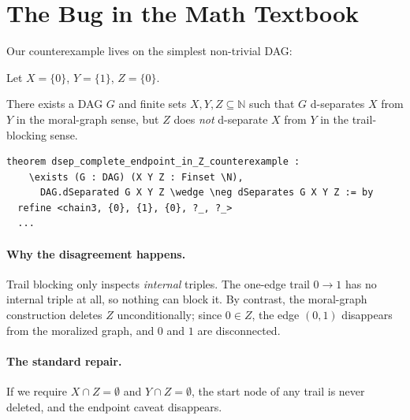 \documentclass[acmsmall,screen,nonacm]{acmart}
\newcommand{\N}{\mathbb{N}}
\begin{document}
\section{The Bug in the Math Textbook}\label{sec:counterexample}

Our counterexample lives on the simplest non-trivial DAG:

\begin{center}
\end{center}

Let $X = \{0\}$, $Y = \{1\}$, $Z = \{0\}$.

\begin{theorem}\label{thm:counterexample}
There exists a DAG $G$ and finite sets $X, Y, Z \subseteq \N$ such that
$G$ d-separates $X$ from $Y$ in the moral-graph sense, but $Z$ does \emph{not}
d-separate $X$ from $Y$ in the trail-blocking sense.
\end{theorem}

\begin{lstlisting}[caption={Mechanized counterexample}]
theorem dsep_complete_endpoint_in_Z_counterexample :
    \exists (G : DAG) (X Y Z : Finset \N),
      DAG.dSeparated G X Y Z \wedge \neg dSeparates G X Y Z := by
  refine <chain3, {0}, {1}, {0}, ?_, ?_>
  ...
\end{lstlisting}

\paragraph{Why the disagreement happens.} Trail blocking only inspects
\emph{internal} triples.  The one-edge trail $0 \to 1$ has no internal triple at
all, so nothing can block it.  By contrast, the moral-graph construction deletes
$Z$ unconditionally; since $0 \in Z$, the edge $(0,1)$ disappears from the
moralized graph, and $0$ and $1$ are disconnected.

\paragraph{The standard repair.} If we require $X \cap Z = \emptyset$ and
$Y \cap Z = \emptyset$, the start node of any trail is never deleted, and the
endpoint caveat disappears.
\end{document}
